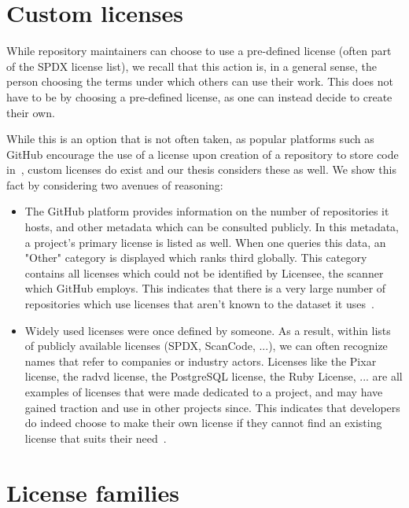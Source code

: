 \section{Custom licenses}\label{sec:custom-licenses}

While repository maintainers can choose to use a pre-defined license (often part of the SPDX license list), we recall that this action is, in a general sense, the person choosing the terms under which others can use their work. This does not have to be by choosing a pre-defined license, as one can instead decide to create their own.

While this is an option that is not often taken, as popular platforms such as GitHub encourage the use of a license upon creation of a repository to store code in~\cite{github_repository_creation}, custom licenses do exist and our thesis considers these as well. We show this fact by considering two avenues of reasoning:

\begin{itemize}
	\item The GitHub platform provides information on the number of repositories it hosts, and other metadata which can be consulted publicly. In this metadata, a project's primary license is listed as well. When one queries this data, an "Other" category is displayed which ranks third globally. This category contains all licenses which could not be identified by Licensee, the scanner which GitHub employs. This indicates that there is a very large number of repositories which use licenses that aren't known to the dataset it uses~\cite{github_innovation_graph_2025}.
	\item Widely used licenses were once defined by someone. As a result, within lists of publicly available licenses (SPDX, ScanCode, ...), we can often recognize names that refer to companies or industry actors. Licenses like the Pixar license, the radvd license, the PostgreSQL license, the Ruby License, ... are all examples of licenses that were made dedicated to a project, and may have gained traction and use in other projects since. This indicates that developers do indeed choose to make their own license if they cannot find an existing license that suits their need~\cite{spdx-licenses,scancode-licensedb}.
\end{itemize}

\section{License families}\label{sec:license-families}

